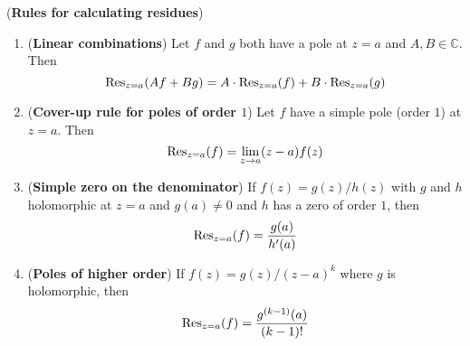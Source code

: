 \begin{proposition}\label{prop:calculatingResidues}
	(\textbf{Rules for calculating residues})
	\begin{enumerate}
		\item (\textbf{Linear combinations}) Let $f$ and $g$ both have a pole at $z = a$ and $A, B \in \mathbb{C}$. Then
		\[
			\text{Res}_{z = a}(Af + Bg) = A \cdot \text{Res}_{z = a}(f) + B \cdot \text{Res}_{z = a}(g)
		\]
		\item (\textbf{Cover-up rule for poles of order $1$}) Let $f$ have a simple pole (order $1$) at $z = a$. Then
		\[
			\text{Res}_{z = a}(f) = \lim_{z \to a} (z - a) f(z)
		\]
		\item (\textbf{Simple zero on the denominator}) If $f(z) = g(z) / h(z)$ with $g$ and $h$ holomorphic at $z = a$ and $g(a) \ne 0$ and $h$ has a zero of order $1$, then
		\[
			\text{Res}_{z = a}(f) = \frac{g(a)}{h'(a)}
		\]
		\item (\textbf{Poles of higher order}) If $f(z) = g(z) / {(z - a)}^k$ where $g$ is holomorphic, then
		\[
			\text{Res}_{z = a}(f) = \frac{g^{(k - 1)} (a)}{(k - 1)!}
		\]
	\end{enumerate}
\end{proposition}

